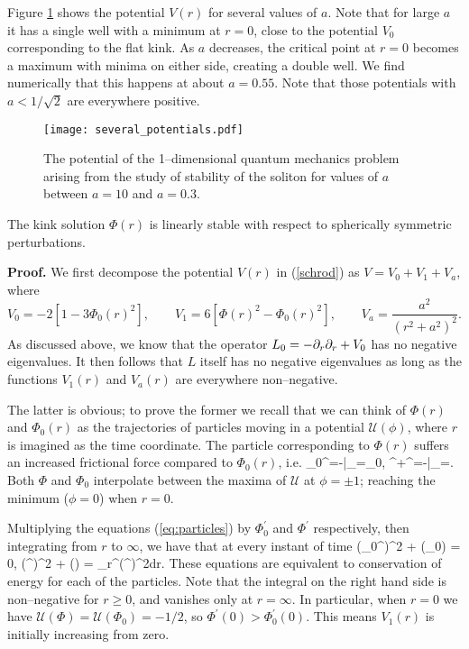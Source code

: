 Figure \ref{fig:several_potentials} shows the potential $V(r)$ for several values of $a$. Note that for large $a$ it has a single well with a minimum at $r=0$, close to the potential $V_0$ corresponding to the flat kink. As $a$ decreases, the critical point at $r=0$ becomes a maximum with minima on either side, creating a double well. We find numerically that this happens at about $a=0.55$. Note that those potentials with $a<1/\sqrt{2}$ are everywhere positive.

\begin{figure}
\texttt{[image: several\_potentials.pdf]}
\caption{\label{fig:several_potentials}The potential of the 1--dimensional quantum mechanics problem arising from the study of stability of the soliton for values of $a$ between $a=10$ and $a=0.3$.}
\end{figure}

\begin{prop}
The kink solution $\Phi(r)$ is linearly stable with respect to spherically symmetric perturbations.
\end{prop} 

{\bf Proof.} We first decompose the potential $V(r)$ in (\ref{schrod}) as $V=V_0+V_1+V_a$, where
\[
V_0 = -2[1-3\Phi_0(r)^2],\qquad 
V_1 = 6[\Phi(r)^2-\Phi_0(r)^2],\qquad V_a = \frac{a^2}{(r^2+a^2)^2}.
\]
As discussed above, we know that the operator $L_0 = -\partial_r\partial_r + V_0$ has no negative eigenvalues. It then follows that $L$ itself has no negative eigenvalues as long as the functions $V_1(r)$ and $V_a(r)$ are everywhere non--negative.

The latter is obvious; to prove the former we recall that we can think of $\Phi(r)$ and $\Phi_0(r)$ as the trajectories of particles moving in a potential $\mathcal{U}(\phi)$, where $r$ is imagined as the time coordinate. The particle corresponding to $\Phi(r)$ suffers an increased frictional force compared to $\Phi_0(r)$, i.e.
\be
\label{eq:particles}
\Phi_0^{\prime\prime}=-\bigg|_{\phi=\Phi_0},\qquad
\Phi^{\prime\prime}+\Phi^\prime=-\bigg|_{\phi=\Phi}.
\ee
Both $\Phi$ and $\Phi_0$ interpolate between the maxima of $\mathcal{U}$ at $\phi=\pm 1$; reaching the minimum ($\phi=0$) when $r=0$.

Multiplying the equations (\ref{eq:particles}) by $\Phi_0^\prime$ and $\Phi^\prime$ respectively, then integrating from $r$ to $\infty$, we have that at every instant of time
\be
\label{eq:energy}
(\Phi_0^\prime)^2 + (\Phi_0) = 0,\qquad
{}(\Phi^\prime)^2 + (\Phi) = \int_r^\infty{}(\Phi^\prime)^2dr.
\ee
These equations are equivalent to conservation of energy for each of the particles. Note that the integral on the right hand side is non--negative for $r\geq 0$, and vanishes only at $r=\infty$. In particular, when $r=0$ we have $\mathcal{U}(\Phi)=\mathcal{U}(\Phi_0)=-1/2$, so $\Phi^\prime(0)>\Phi_0^\prime(0)$. This means $V_1(r)$ is initially increasing from zero.

